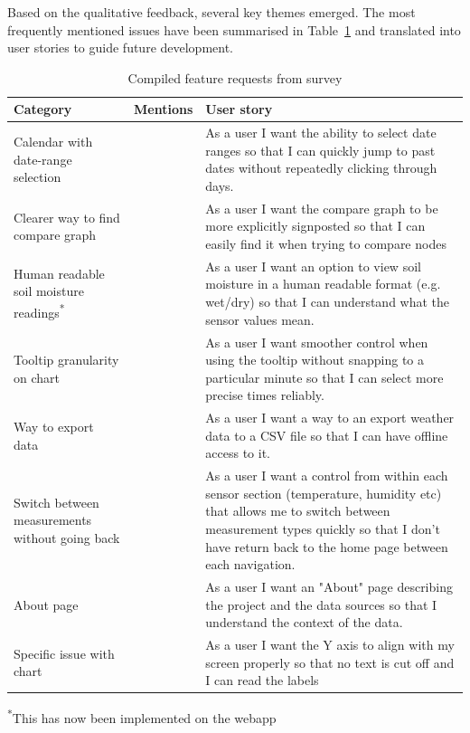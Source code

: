 Based on the qualitative feedback, several key themes emerged. The most
frequently mentioned issues have been summarised in
Table~\ref{tab:feature-requests} and translated into user stories to guide
future development.

\begin{table}[H]
  \centering
  \small
  \begin{tabularx}{\textwidth}{>{\RaggedRight\arraybackslash}p{}
  >{\centering\arraybackslash}p{1.5cm} >{\RaggedRight\arraybackslash}X}
    \hline
    Category & Mentions & User story \\
    \hline
    Calendar with date-range selection & 4 & As a user I want the ability to
    select date ranges so that I can quickly jump to past dates without
    repeatedly clicking through days. \\
    \hline
    Clearer way to find compare graph & 2 & As a user I want the compare graph
    to be more explicitly signposted so that I can easily find it when trying to
    compare nodes \\
    \hline
    Human readable soil moisture readings\textsuperscript{*} & 1 & As a user I
    want an option to view soil moisture in a human readable format (e.g.
    wet/dry) so that I can understand what the sensor values mean. \\
    \hline
    Tooltip granularity on chart & 1 & As a user I want smoother control when
    using the tooltip without snapping to a particular minute so that I can
    select more precise times reliably. \\
    \hline
    Way to export data  & 1 & As a user I want a way to an export weather data
    to a CSV file so that I can have offline access to it. \\
    \hline
    Switch between measurements without going back & 1 & As a user I want a
    control from within each sensor section (temperature, humidity etc) that
    allows me to switch between measurement types quickly so that I don't have
    return back to the home page between each navigation. \\
    \hline
    About page & 1 & As a user I want an "About" page describing the project and
    the data sources so that I understand the context of the data. \\
    \hline
    Specific issue with chart & 1 & As a user I want the Y axis to align with my
    screen properly so that no text is cut off and I can read the labels \\
    \hline
  \end{tabularx}
\noindent\textsuperscript{*}\small This has now been implemented on the webapp
\caption{Compiled feature requests from survey}
  \label{tab:feature-requests}
\end{table}


